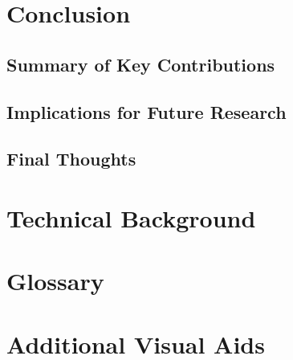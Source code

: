 \documentclass[12pt, a4paper]{article}
\theoremstyle{definitionstyle}
\begin{document}
\section{Conclusion}
\subsection{Summary of Key Contributions}

\subsection{Implications for Future Research}

\subsection{Final Thoughts}

\appendix
\section{Technical Background}

\section{Glossary}

\section{Additional Visual Aids}



\end{document}
